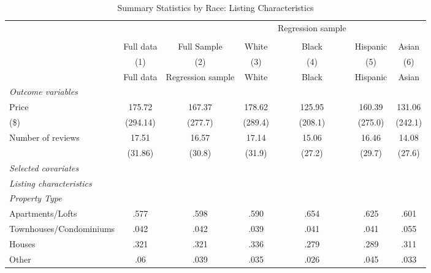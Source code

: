 {
\def\sym#1{\ifmmode^{#1}\else\(^{#1}\)\fi}
\begin{longtable}{l*{6}{c}}
\caption{Summary Statistics by Race: Listing Characteristics}\\
\hline
                  &\multicolumn{1}{c}{}&\multicolumn{1}{c}{}&\multicolumn{1}{c}{}&\multicolumn{1}{c}{Regression sample}&\multicolumn{1}{c}{}&\multicolumn{1}{c}{}\\
                  		\cline{3-7}\\
                  &\multicolumn{1}{c}{Full data}&\multicolumn{1}{c}{Full Sample}&\multicolumn{1}{c}{White}&\multicolumn{1}{c}{Black}&\multicolumn{1}{c}{Hispanic}&\multicolumn{1}{c}{Asian}\\
                  
                  \hline\hline\endfirsthead\hline\endhead\hline\endfoot\endlastfoot
                  &\multicolumn{1}{c}{(1)}&\multicolumn{1}{c}{(2)}&\multicolumn{1}{c}{(3)}&\multicolumn{1}{c}{(4)}&\multicolumn{1}{c}{(5)}&\multicolumn{1}{c}{(6)}\\
                  &\multicolumn{1}{c}{Full data}&\multicolumn{1}{c}{Regression sample}&\multicolumn{1}{c}{White}&\multicolumn{1}{c}{Black}&\multicolumn{1}{c}{Hispanic}&\multicolumn{1}{c}{Asian}\\
\hline
\endhead                  
\textit{Outcome variables} \\
\hline
Price         & 175.72  &           167.37         &           178.62         &           125.95         &           160.39       &   131.06\\
(\$)                  & (294.14) &         (277.7)         &         (289.4)         &         (208.1)         &         (275.0)     & (242.1)    \\
[1em]
Number of reviews     & 17.51  &      16.57  &      17.14         &      15.06&      16.46 & 	14.08\\
                 & (31.86)  &     (30.8)         &     (31.9)         &     (27.2)         &     (29.7)        & (27.6) \\
[1em]
\textit{Selected covariates} \\
\hline\hline
\textit{Listing characteristics} \\
\hline
\textit{Property Type} \\
Apartments/Lofts     		&	.577 &      .598         &       .590         &      .654        &      .625 			& 	.601         \\
Townhouses/Condominiums   &  .042 &      .042         &      .039         &      .041        &      .041 	& 		.055         \\
Houses    				&.321	&      .321         &       .336        &      .279        &      .289				& 		.311         \\
Other    				&.06	&      .039      &       .035        &      .026        &      .045	& 		.033        \\
[1em]


\end{longtable}}
